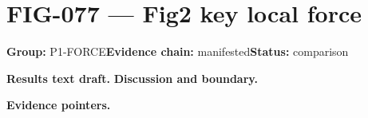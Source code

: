 \clearpage
\section{FIG-077 --- Fig2 key local force}
\label{figpage:fig-077}
\textbf{Group:} P1-FORCE\quad \textbf{Evidence chain:} manifested\quad \textbf{Status:} comparison

\textbf{Results text draft.} 
\textbf{Discussion and boundary.} 


\textbf{Evidence pointers.}



\vfill
